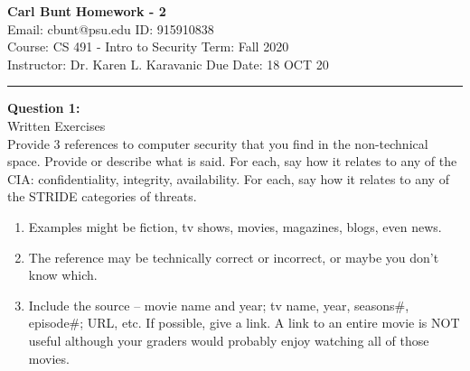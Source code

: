 \documentclass[a4paper, 11pt]{article}
\newenvironment{problem}[2][Question]
               { \begin{mdframed}[backgroundcolor=gray!20] \textbf{#1 #2:} \\}
               {   \end{mdframed}}
\begin{document}
 \noindent
 \large\textbf{Carl Bunt} \hfill \textbf{Homework - 2}   \\
 Email: cbunt@psu.edu \hfill ID: 915910838 \\
 \normalsize Course: CS 491 - Intro to Security \hfill Term: Fall 2020\\
 Instructor: Dr. Karen L. Karavanic \hfill Due Date: 18 OCT 20\\
 \noindent\rule{7in}{2.8pt}

 \begin{problem}{1}
   Written Exercises \\
   Provide 3 references to computer security that you find in the non-technical space.  Provide or describe what is said.  For each, say how it relates to any of the CIA:  confidentiality, integrity, availability.  For each, say how it relates to any of the STRIDE categories of threats.
   \begin{enumerate}[label=\alph*.]
   \item Examples might be fiction, tv shows, movies, magazines, blogs, even news.
   \item The reference may be technically correct or incorrect, or maybe you don’t know which.
   \item Include the source – movie name and year;  tv name, year, seasons\#, episode\#; URL, etc.  If possible, give a link.  A link to an entire movie is NOT useful although your graders would probably enjoy watching all of those movies.
   \end{enumerate}
 \end{problem}
\end{document}
